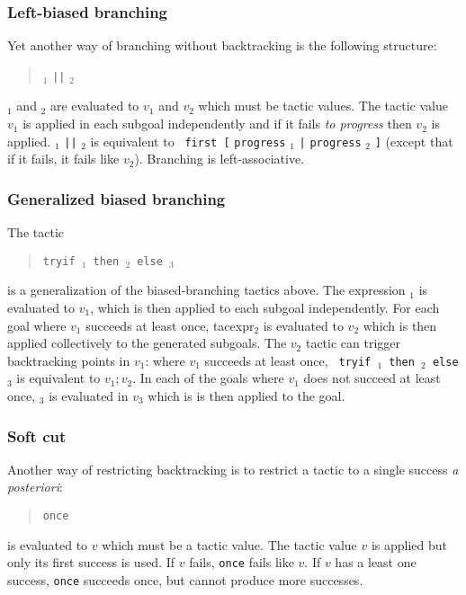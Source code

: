 \ErrMsg {}

\subsubsection[Left-biased branching]{Left-biased branching\tacindex{$\mid\mid$}
}

Yet another way of branching without backtracking is the following structure:
\begin{quote}
{\tacexpr}$_1$ {\tt ||} {\tacexpr}$_2$
\end{quote}
{\tacexpr}$_1$ and {\tacexpr}$_2$ are evaluated to $v_1$ and
$v_2$ which must be tactic values. The tactic value $v_1$ is applied in each
subgoal independently and if it fails \emph{to progress} then $v_2$ is
applied. {\tacexpr}$_1$ {\tt ||} {\tacexpr}$_2$ is equivalent to {\tt
  first [} {\tt progress} {\tacexpr}$_1$ {\tt |} {\tt progress}
  {\tacexpr}$_2$ {\tt ]} (except that if it fails, it fails like
$v_2$). Branching is left-associative.

\subsubsection[Generalized biased branching]{Generalized biased branching
}

The tactic
\begin{quote}
{\tt tryif {\tacexpr}$_1$ then {\tacexpr}$_2$ else {\tacexpr}$_3$}
\end{quote}
is a generalization of the biased-branching tactics above. The
expression {\tacexpr}$_1$ is evaluated to $v_1$, which is then applied
to each subgoal independently. For each goal where $v_1$ succeeds at
least once, {tacexpr}$_2$ is evaluated to $v_2$ which is then applied
collectively to the generated subgoals. The $v_2$ tactic can trigger
backtracking points in $v_1$: where $v_1$ succeeds at least once, {\tt
  tryif {\tacexpr}$_1$ then {\tacexpr}$_2$ else {\tacexpr}$_3$} is
equivalent to $v_1;v_2$. In each of the goals where $v_1$ does not
succeed at least once, {\tacexpr}$_3$ is evaluated in $v_3$ which is
is then applied to the goal.

\subsubsection[Soft cut]{Soft cut}

Another way of restricting backtracking is to restrict a tactic to a
single success \emph{a posteriori}:
\begin{quote}
{\tt once} {\tacexpr}
\end{quote}
{\tacexpr} is evaluated to $v$ which must be a tactic value.
The tactic value $v$ is
applied but only its first success is used. If $v$ fails, {\tt once}
{\tacexpr} fails like $v$. If $v$ has a least one success, {\tt once}
{\tacexpr} succeeds once, but cannot produce more successes.

